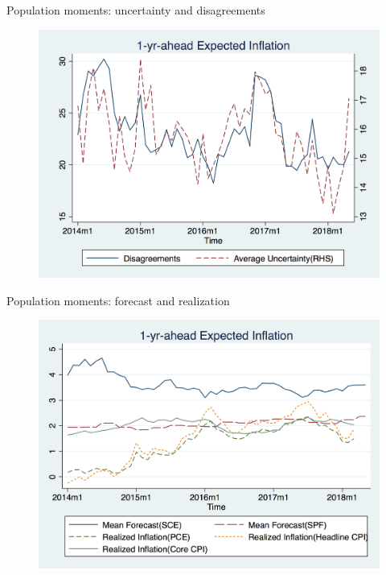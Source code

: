 \documentclass{beamer}
\begin{document}
\begin{frame}{Population moments: uncertainty and disagreements}
\begin{figure}
	\includegraphics[scale=0.3]{figures/var_diag.png} 
\end{figure}
\end{frame}



\begin{frame}{Population moments: forecast and realization}
\begin{figure}
	\includegraphics[scale=0.3]{figures/mean_true.png} 
\end{figure}
\end{frame}
\end{document}
